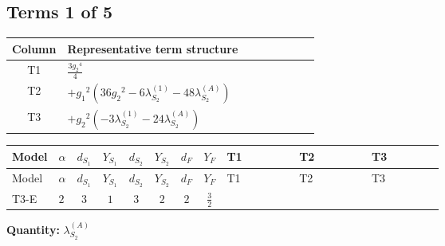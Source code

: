 \documentclass[8pt]{article}
\begin{document}
\begin{landscape}
\subsection*{Terms 1 of 5}
\begin{center}
\begin{tabular}{@{}c >{\raggedright\arraybackslash}p{0.82\linewidth}@{}}
\toprule
Column & Representative term structure \\
\midrule
T1 & \(\displaystyle \frac{3 {g_2}^4}{4}\) \\
\midrule
T2 & \(\displaystyle +{g_1}^2 \left(36 {g_2}^2-6 {\lambda_{S_2}^{(1)}}-48 {\lambda_{S_2}^{(A)}}\right)\) \\
\midrule
T3 & \(\displaystyle +{g_2}^2 (-3 {\lambda_{S_2}^{(1)}}-24 {\lambda_{S_2}^{(A)}})\) \\
\midrule
\bottomrule
\end{tabular}
\end{center}
\smallskip
\tiny
\begin{longtable}{@{}llcccccc >{\raggedright\arraybackslash}p{0.21\linewidth} >{\raggedright\arraybackslash}p{0.21\linewidth} >{\raggedright\arraybackslash}p{0.21\linewidth}@{}}
\toprule
Model & $\alpha$ & $d_{S_1}$ & $Y_{S_1}$ & $d_{S_2}$ & $Y_{S_2}$ & $d_F$ & $Y_F$ & T1 & T2 & T3 \\
\midrule
\endfirsthead
\toprule
Model & $\alpha$ & $d_{S_1}$ & $Y_{S_1}$ & $d_{S_2}$ & $Y_{S_2}$ & $d_F$ & $Y_F$ & T1 & T2 & T3 \\
\midrule
\endhead
T3-E & $2$ & $3$ & $1$ & $3$ & $2$ & $2$ & $\frac{3}{2}$ & \scriptsize\adjustbox{max width=\linewidth}{$\begin{gathered} \frac{3 {g_2}^4}{4}\end{gathered}$} & \scriptsize\adjustbox{max width=\linewidth}{$\begin{gathered} +{g_1}^2 \left(36 {g_2}^2-6 {\lambda_{S_2}^{(1)}}-48 {\lambda_{S_2}^{(A)}}\right)\end{gathered}$} & \scriptsize\adjustbox{max width=\linewidth}{$\begin{gathered} +{g_2}^2 (-3 {\lambda_{S_2}^{(1)}}-24 {\lambda_{S_2}^{(A)}})\end{gathered}$} \\
\midrule
\bottomrule
\end{longtable}
\clearpage
\noindent\textbf{Quantity: }$\lambda_{S_2}^{(A)}$\par\smallskip

\end{landscape}
\end{document}
